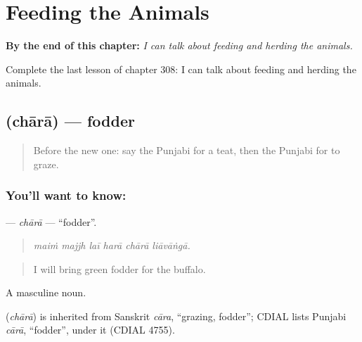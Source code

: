 
\chapter{Feeding the Animals}
\label{ch:pa-a2-feeding-the-animals}

\begin{chapteropening}
\textbf{By the end of this chapter:} \emph{I can talk about feeding and herding the animals.}

Complete the last lesson of chapter 308: I can talk about feeding and herding the animals.
\end{chapteropening}

\section[\texorpdfstring{\pa{ਚਾਰਾ} (chārā)}{ਚਾਰਾ (chārā)}]{ (chārā) — fodder}

\label{lesson:PA-C308-chara}



\begin{quote}
Before the new one: say the Punjabi for a teat, then the Punjabi for to graze.
\end{quote}

\subsection*{You'll want to know: }
\textbf{} — \emph{chārā} — \textquotedblleft{}fodder\textquotedblright{}.

\begin{quote}
     
\end{quote}

\begin{quote}
\emph{maiṁ majjh laī harā chārā liāvāṅgā.}
\end{quote}

\begin{quote}
I will bring green fodder for the buffalo.
\end{quote}

A masculine noun.

\begin{cousinweb}
\textbf{} (\emph{chārā}) is inherited from Sanskrit \emph{cāra}, \textquotedblleft{}grazing, fodder\textquotedblright{}; CDIAL lists Punjabi \emph{cārā}, \textquotedblleft{}fodder\textquotedblright{}, under it (CDIAL 4755).
\end{cousinweb}

